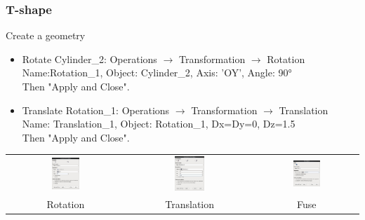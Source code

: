 \documentclass[10pt, hyperref={unicode=true,pdfusetitle, bookmarks=true,bookmarksnumbered=false,bookmarksopen=false, breaklinks=false,pdfborder={0 0 1},backref=true,colorlinks=true,linkcolor=darkblue,pageanchor}]{beamer}
\begin{document}
\begin{frame}
\frametitle{T-shape}
\begin{block}{Create a geometry}

\begin{itemize}
\item Rotate Cylinder\_2: Operations $\rightarrow$ Transformation $\rightarrow$ Rotation\\
Name:Rotation\_1, Object: Cylinder\_2, Axis: 'OY', Angle: 90° \\
Then "Apply and Close".

\item Translate Rotation\_1: Operations $\rightarrow$ Transformation $\rightarrow$ Translation\\
Name: Translation\_1, Object: Rotation\_1, Dx=Dy=0, Dz=1.5 \\
Then "Apply and Close".
\end{itemize}

\begin{center}
\begin{tabular}{ccc}
\includegraphics[width=0.25\textwidth]{PICTURES/salome11} & \includegraphics[width=0.25\textwidth]{PICTURES/salome12} & \includegraphics[width=0.28\textwidth]{PICTURES/salome13} \tabularnewline
Rotation & Translation & Fuse \tabularnewline
\end{tabular}
\end{center}

\end{block}
\end{frame}
\end{document}
